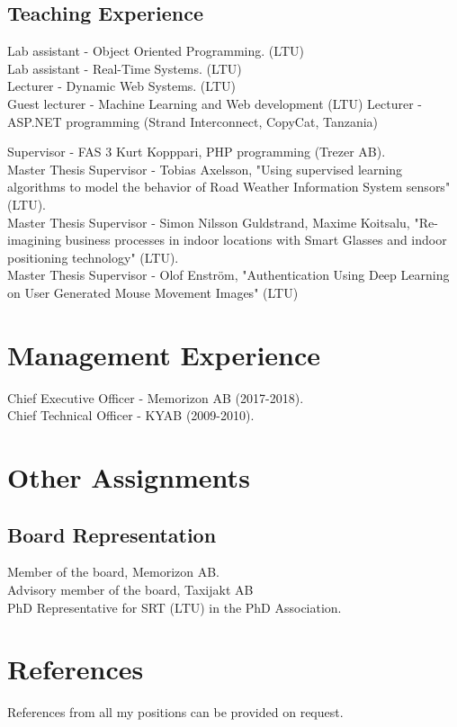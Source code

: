 \documentclass{article}
\begin{document}
\subsection{Teaching Experience}
Lab assistant - Object Oriented Programming. (LTU) \\
Lab assistant - Real-Time Systems. (LTU) \\
Lecturer - Dynamic Web Systems. (LTU) \\
Guest lecturer - Machine Learning and Web development (LTU)
Lecturer - ASP.NET programming (Strand Interconnect, CopyCat, Tanzania)

Supervisor - FAS 3 Kurt Kopppari, PHP programming (Trezer AB).\\
Master Thesis Supervisor - Tobias Axelsson, "Using supervised learning algorithms to model the behavior of Road Weather Information System sensors" (LTU). \\
Master Thesis Supervisor - Simon Nilsson Guldstrand, Maxime Koitsalu, "Re-imagining business processes in indoor locations with Smart Glasses and indoor positioning technology" (LTU). \\
Master Thesis Supervisor - Olof Enström, "Authentication Using Deep Learning on
User Generated Mouse Movement Images" (LTU)

\section{Management Experience}
Chief Executive Officer - Memorizon AB (2017-2018).\\
Chief Technical Officer - KYAB (2009-2010).

\section{Other Assignments}
\subsection{Board Representation}
Member of the board, Memorizon AB. \\
Advisory member of the board, Taxijakt AB\\
PhD Representative for SRT (LTU) in the PhD Association.

\section{References}
References from all my positions can be provided on request.
\end{document}
